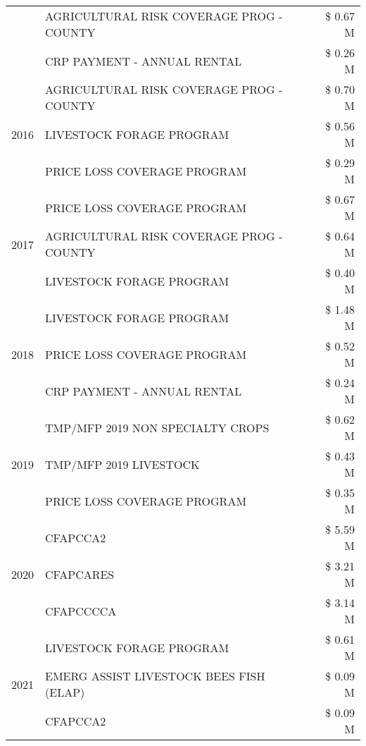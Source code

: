 \begin{tabular}{llr}
 & AGRICULTURAL RISK COVERAGE PROG - COUNTY & \$ 0.67 M \\
 & CRP PAYMENT - ANNUAL RENTAL & \$ 0.26 M \\
\cline{1-3}
\multirow[t]{3}{*}{2016} & AGRICULTURAL RISK COVERAGE PROG - COUNTY & \$ 0.70 M \\
 & LIVESTOCK FORAGE PROGRAM & \$ 0.56 M \\
 & PRICE LOSS COVERAGE PROGRAM & \$ 0.29 M \\
\cline{1-3}
\multirow[t]{3}{*}{2017} & PRICE LOSS COVERAGE PROGRAM & \$ 0.67 M \\
 & AGRICULTURAL RISK COVERAGE PROG - COUNTY & \$ 0.64 M \\
 & LIVESTOCK FORAGE PROGRAM & \$ 0.40 M \\
\cline{1-3}
\multirow[t]{3}{*}{2018} & LIVESTOCK FORAGE PROGRAM & \$ 1.48 M \\
 & PRICE LOSS COVERAGE PROGRAM & \$ 0.52 M \\
 & CRP PAYMENT - ANNUAL RENTAL & \$ 0.24 M \\
\cline{1-3}
\multirow[t]{3}{*}{2019} & TMP/MFP 2019 NON SPECIALTY CROPS & \$ 0.62 M \\
 & TMP/MFP 2019 LIVESTOCK & \$ 0.43 M \\
 & PRICE LOSS COVERAGE PROGRAM & \$ 0.35 M \\
\cline{1-3}
\multirow[t]{3}{*}{2020} & CFAPCCA2 & \$ 5.59 M \\
 & CFAPCARES & \$ 3.21 M \\
 & CFAPCCCCA & \$ 3.14 M \\
\cline{1-3}
\multirow[t]{3}{*}{2021} & LIVESTOCK FORAGE PROGRAM & \$ 0.61 M \\
 & EMERG ASSIST LIVESTOCK BEES FISH (ELAP) & \$ 0.09 M \\
 & CFAPCCA2 & \$ 0.09 M \\
\cline{1-3}
\bottomrule
\end{tabular}
